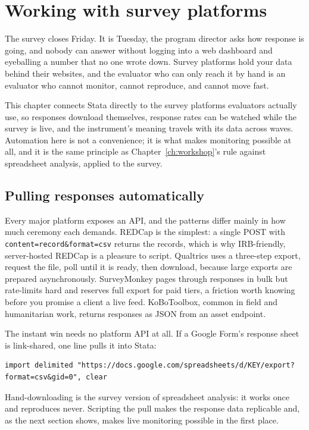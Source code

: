 \documentclass[
    a4paper,
    fontsize=10pt,
    twoside=true,
    numbers=noenddot,
]{kaobook}
\begin{document}
\chapter{Working with survey platforms}\label{ch:surveys}

The survey closes Friday. It is Tuesday, the program director asks how response is going, and nobody can answer without logging into a web dashboard and eyeballing a number that no one wrote down. Survey platforms hold your data behind their websites, and the evaluator who can only reach it by hand is an evaluator who cannot monitor, cannot reproduce, and cannot move fast.

This chapter connects Stata directly to the survey platforms evaluators actually use, so responses download themselves, response rates can be watched while the survey is live, and the instrument's meaning travels with its data across waves. Automation here is not a convenience; it is what makes monitoring possible at all, and it is the same principle as Chapter~\ref{ch:workshop}'s rule against spreadsheet analysis, applied to the survey.

\section{Pulling responses automatically}
Every major platform exposes an API, and the patterns differ mainly in how much ceremony each demands. REDCap is the simplest: a single POST with \texttt{content=record\&format=csv} returns the records, which is why IRB-friendly, server-hosted REDCap is a pleasure to script. Qualtrics uses a three-step export, request the file, poll until it is ready, then download, because large exports are prepared asynchronously. SurveyMonkey pages through responses in bulk but rate-limits hard and reserves full export for paid tiers, a friction worth knowing before you promise a client a live feed. KoBoToolbox, common in field and humanitarian work, returns responses as JSON from an asset endpoint.

The instant win needs no platform API at all. If a Google Form's response sheet is link-shared, one line pulls it into Stata:
{\footnotesize
\begin{verbatim}
import delimited "https://docs.google.com/spreadsheets/d/KEY/export?format=csv&gid=0", clear
\end{verbatim}
}
Hand-downloading is the survey version of spreadsheet analysis: it works once and reproduces never. Scripting the pull makes the response data replicable and, as the next section shows, makes live monitoring possible in the first place.
\end{document}
